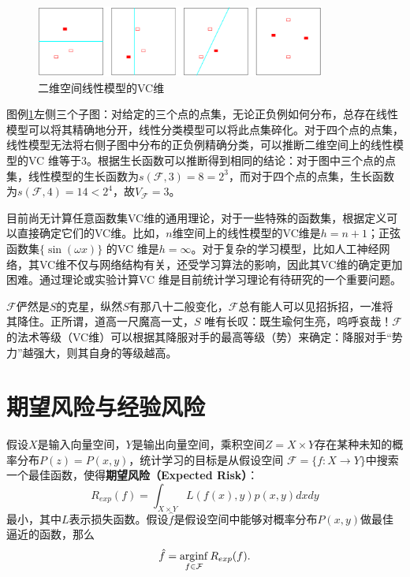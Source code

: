 \begin{figure}[htbp]
  \centering
  \includegraphics[width=0.85\textwidth]{figures/shatteredset.eps}
  \caption{二维空间线性模型的VC维}\label{fig:vcdimension}
\end{figure}
图例\ref{fig:vcdimension}左侧三个子图：对给定的三个点的点集，无论正负例如何分布，总存在线性模型可以将其精确地分开，线性分类模型可以将此点集碎化。对于四个点的点集，线性模型无法将右侧子图中分布的正负例精确分类，可以推断二维空间上的线性模型的VC 维等于3。根据生长函数可以推断得到相同的结论：对于图中三个点的点集，线性模型的生长函数为$s(\mathcal F,3) = 8 = 2^3$，而对于四个点的点集，生长函数为$s(\mathcal F,4) = 14 < 2^4$，故$V_{\mathcal F} = 3$。

目前尚无计算任意函数集VC维的通用理论，对于一些特殊的函数集，根据定义可以直接确定它们的VC维。比如，$n$维空间上的线性模型的VC维是$h=n+1$；正弦函数集$\{\sin(\omega x)\}$ 的VC 维是$h=\infty$。对于复杂的学习模型，比如人工神经网络，其VC维不仅与网络结构有关，还受学习算法的影响，因此其VC维的确定更加困难。通过理论或实验计算VC 维是目前统计学习理论有待研究的一个重要问题。

\begin{remark}
$\mathcal{F}$俨然是$S$的克星，纵然$S$有那八十二般变化，$\mathcal{F}$总有能人可以见招拆招，一准将其降住。正所谓，道高一尺魔高一丈，$S$ 唯有长叹：既生瑜何生亮，呜呼哀哉！$\mathcal{F}$的法术等级（VC维）可以根据其降服对手的最高等级（势）来确定：降服对手“势力”越强大，则其自身的等级越高。
\end{remark}

\section{期望风险与经验风险}
假设$X$是输入向量空间，$Y$是输出向量空间，乘积空间$Z=X\times Y$存在某种未知的概率分布$P(z) = P(x,y)$，统计学习的目标是从假设空间
$\mathcal F = \{f:X\rightarrow Y\}$中搜索一个最佳函数，使得\textbf{期望风险（Expected Risk）}：
\begin{equation}\label{eq:expectedrisk}
    R_{exp}(f) = \int_{X\times Y}{L(f(x),y)p(x,y)dxdy}
\end{equation}
最小，其中$L$表示损失函数。假设$\hat f$是假设空间中能够对概率分布$P(x,y)$做最佳逼近的函数，那么
\begin{equation}
    \hat f = \operatorname*{\mathrm{\arg\!\inf}}\limits_{f\in \mathcal F}R_{exp}(f).
\end{equation}

